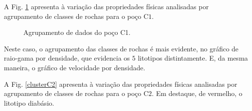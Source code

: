 A Fig. \ref{clusterC1} apresenta à variação das propriedades físicas analisadas por agrupamento de classes de rochas para o poço C$1$.

\begin{figure}[H]
	\centering
	\setlength{\fboxsep}{8pt}
	\setlength{\fboxrule}{0.1pt}
	\caption{Agrupamento de dados do poço C1.}
	\label{clusterC1}
\end{figure} 

Neste caso, o agrupamento das classes de rochas é mais evidente, no gráfico de raio-gama por densidade, que evidencia os $5$ litotipos distintamente. E, da mesma maneira, o gráfico de velocidade por densidade.


A Fig. \ref{clusterC2} apresenta à variação das propriedades físicas analisadas por agrupamento de classes de rochas para o poço C$2$. Em destaque, de vermelho, o litotipo diabásio. 

